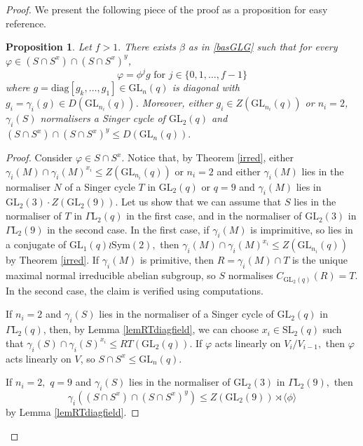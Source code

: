 \documentclass[a4paper,reqno,11pt]{amsart}
\newtheorem{Prop}[Th]{Proposition}
\theoremstyle{definition}
\theoremstyle{remark}
\numberwithin{equation}{section}
\newcommand{\Sym}{\mathrm{Sym}}
\newcommand{\diag}{\mathrm{diag}}
\newcommand{\GaL}{{\Gamma \mathrm{L}}}
\newcommand{\SL}{{\mathrm{SL}}}
\newcommand{\GL}{{\mathrm{GL}}}
\begin{document}
\begin{proof}
 
  We present the following piece of the proof as a proposition for easy reference. 
\begin{Prop} 
\label{clm44}
Let $f>1.$ There exists $\beta$ as in \eqref{basGLG} such that for every $\varphi \in (S \cap S^x) \cap (S \cap S^x)^y$, 
$$\varphi=\phi^j g \text{ for } j \in \{0,1, \ldots,f-1\}$$
where $g=\diag[g_k, \ldots, g_1] \in \GL_n(q)$ is diagonal with $g_i=\gamma_i(g) \in D(\GL_{n_i}(q))$.
 Moreover, either $g_i \in Z(\GL_{n_i}(q))$ or $n_i=2$,  $\gamma_i(S)$ normalisers a Singer cycle of $\GL_2(q)$ and $(S \cap S^x) \cap (S \cap S^x)^y \le D(\GL_n(q)).$ %
\end{Prop}
\begin{proof}
Consider $\varphi \in S \cap S^x.$
Notice that, by Theorem \ref{irred}, either $\gamma_i(M) \cap \gamma_i(M)^{x_i} \le Z(\GL_{n_i}(q))$ or $n_i=2$ and either $\gamma_i(M)$ lies  in the normaliser $N$ of a Singer cycle $T$ in $\GL_2(q)$ or $q=9$ and $\gamma_i(M)$ lies in $\GL_2(3) \cdot Z(\GL_2(9)).$ Let us show that we can assume that $S$ lies in the normaliser of $T$ in $\GaL_2(q)$ in the first case, and in the normaliser of $\GL_2(3)$ in $\GaL_2(9)$ in the second case. In the first case, if $\gamma_i(M)$ is imprimitive, so lies in a conjugate of $\GL_1(q)\wr \Sym(2),$ then  $\gamma_i(M) \cap \gamma_i(M)^{x_i} \le Z(\GL_{n_i}(q))$ by Theorem \ref{irred}. If $\gamma_i(M)$ is primitive, then $R=\gamma_i(M) \cap T$ is the unique maximal normal irreducible abelian subgroup, so $S$ normalises $C_{\GL_2(q)}(R)=T$. In the second case, the claim is verified using computations.    

 If $n_i=2$ and $\gamma_i(S)$ lies in the normaliser of a Singer cycle of $\GL_2(q)$ in $\GaL_2(q)$, then, by Lemma \ref{lemRTdiagfield}, we can choose $x_i \in \SL_2(q)$ such that $\gamma_i(S) \cap \gamma_i(S)^{x_i}\le RT(\GL_2(q))$.  If $\varphi$ acts linearly on $V_i/V_{i-1},$ then $\varphi$ acts linearly on $V$, so $S \cap S^x \le \GL_n(q)$.
 
  If $n_i=2,$ $q=9$ and $\gamma_i(S)$ lies in the normaliser of $\GL_2(3)$ in $\GaL_2(9),$ then
  $$\gamma_i((S \cap S^x) \cap (S \cap S^x)^y) \le Z(\GL_2(9))\rtimes \langle \phi \rangle$$  by  Lemma \ref{lemRTdiagfield}.


\end{proof}
\end{proof}
\end{document}
